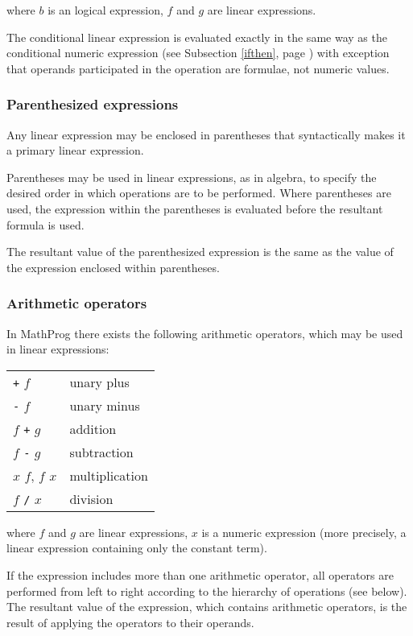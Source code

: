 \documentclass[10pt]{article}
\begin{document}
\noindent where $b$ is an logical expression, $f$ and $g$ are linear
expressions.

The conditional linear expression is evaluated exactly in the same way
as the conditional numeric expression (see Subsection \ref{ifthen},
page \pageref{ifthen}) with exception that operands participated in the
operation are formulae, not numeric values.

\subsubsection{Parenthesized expressions}

Any linear expression may be enclosed in parentheses that syntactically
makes it a primary linear expression.

Parentheses may be used in linear expressions, as in algebra, to
specify the desired order in which operations are to be performed.
Where parentheses are used, the expression within the parentheses is
evaluated before the resultant formula is used.

The resultant value of the parenthesized expression is the same as the
value of the expression enclosed within parentheses.

\subsubsection{Arithmetic operators}

In MathProg there exists the following arithmetic operators, which may
be used in linear expressions:

\medskip

\begin{tabular}{@{}p{96pt}p{222pt}@{}}
{\tt+} $f$&unary plus\\
{\tt-} $f$&unary minus\\
$f$ {\tt+} $g$&addition\\
$f$ {\tt-} $g$&subtraction\\
$x$ {\tt*} $f$, $f$ {\tt*} $x$&multiplication\\
$f$ {\tt/} $x$&division
\end{tabular}

\medskip

\noindent where $f$ and $g$ are linear expressions, $x$ is a numeric
expression (more precisely, a linear expression containing only the
constant term).

If the expression includes more than one arithmetic operator, all
operators are performed from left to right according to the hierarchy
of operations (see below). The resultant value of the expression, which
contains arithmetic operators, is the result of applying the operators
to their operands.
\end{document}
